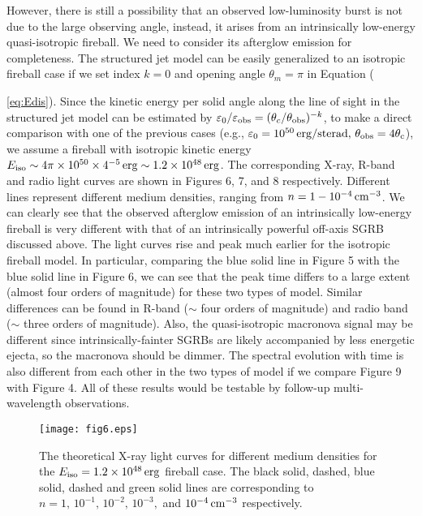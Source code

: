 \documentclass{emulateapj}
\begin{document}
However, there is still a possibility that an observed low-luminosity burst is not due to the large observing angle, instead, it arises from an intrinsically low-energy quasi-isotropic fireball. We need to consider its afterglow emission for completeness. The structured jet model can be easily generalized to an isotropic fireball case if we set index $k=0$ and opening angle $\theta_m=\pi$ in Equation ({\ref{eq:Edis}). Since the kinetic energy per solid angle along the line of sight in the structured jet model can be estimated by $\varepsilon_0/\varepsilon_{\rm obs}=(\theta_c/\theta_{\rm obs})^{-k}$, to make a direct comparison with one of the previous cases (e.g., $\varepsilon_0=10^{50}\,\rm erg/sterad,\,\theta_{\rm obs}=4\theta_c$), we assume a fireball with isotropic kinetic energy $E_{\rm iso}\sim4\pi\times10^{50}\times4^{-5}\,{\rm erg}\sim1.2\times10^{48}\,{\rm erg}$. The corresponding X-ray, R-band and radio light curves are shown in Figures 6, 7, and 8 respectively. Different lines represent different medium densities, ranging from $n=1-10^{-4}\,\rm cm^{-3}$. We can clearly see that the observed afterglow emission of an intrinsically low-energy fireball is very different with that of an intrinsically powerful off-axis SGRB discussed above. The light curves rise and peak much earlier for the isotropic fireball model. In particular, comparing the blue solid line in Figure 5 with the blue solid line in Figure 6, we can see that the peak time differs to a large extent (almost four orders of magnitude) for these two types of model. Similar differences can be found in R-band ($\sim$ four orders of magnitude) and radio band ($\sim$ three orders of magnitude). Also, the quasi-isotropic macronova signal may be different since intrinsically-fainter SGRBs are likely accompanied by less energetic ejecta, so the macronova should be dimmer. The spectral evolution with time is also different from each other in the two types of model if we compare Figure 9 with Figure 4. All of these results would be testable by follow-up multi-wavelength observations.

\begin{figure}
\begin{center}
\texttt{[image: fig6.eps]}
\caption{The theoretical X-ray light curves for different medium densities for the $E_{\rm iso}=1.2\times10^{48}\,{\rm erg}$ fireball case. The black solid, dashed, blue solid, dashed and green solid lines are corresponding to $n=1,\,10^{-1},\,10^{-2},\,10^{-3},$ and $10^{-4}\,\rm cm^{-3}$ respectively.
\label{fig6}}
\end{center}
\end{figure}

}
\end{document}
